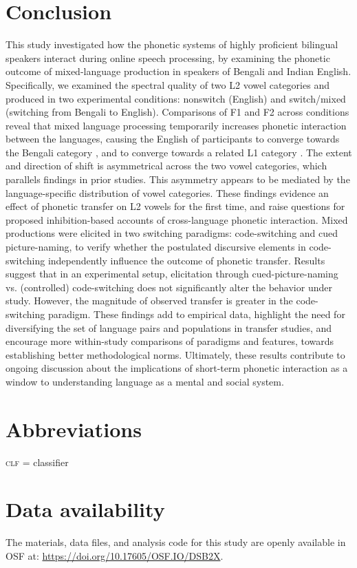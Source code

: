\documentclass[12 pt]{article}
\newcommand{\nt}[1]{\textipa{[#1]}} %
\begin{document}
\section{Conclusion}
This study investigated how the phonetic systems of highly proficient bilingual speakers interact during online speech processing, by examining the phonetic outcome of mixed-language production in speakers of Bengali and Indian English. Specifically, we examined the spectral quality of two L2 vowel categories \nt{2} and \nt{\ae} produced in two experimental conditions: nonswitch (English) and switch/mixed (switching from Bengali to English).
Comparisons of F1 and F2 across conditions reveal that mixed language processing temporarily increases phonetic interaction between the languages, causing the English \nt{\ae} of participants to converge towards the Bengali category \nt{\ae}, and \nt{2} to converge towards a related L1 category \nt{a:}. The extent and direction of shift is asymmetrical across the two vowel categories, which parallels findings in prior studies. This asymmetry appears to be mediated by the language-specific distribution of vowel categories. These findings evidence an effect of phonetic transfer on L2 vowels for the first time, and raise questions for proposed inhibition-based accounts of cross-language phonetic interaction. Mixed productions were elicited in two switching paradigms: code-switching and cued picture-naming, to verify whether the postulated discursive elements in code-switching independently influence the outcome of phonetic transfer. Results suggest that in an experimental setup, elicitation through cued-picture-naming vs. (controlled) code-switching does not significantly alter the behavior under study. However, the magnitude of observed transfer is greater in the code-switching paradigm. These findings add to empirical data, highlight the need for diversifying the set of language pairs and populations in transfer studies, and encourage more within-study comparisons of paradigms and features, towards establishing better methodological norms. Ultimately, these results contribute to ongoing discussion about the implications of short-term phonetic interaction as a window to understanding language as a mental and social system.

\section*{Abbreviations}
\textsc{clf} = classifier

\section*{Data availability} \label{data_availability}
The materials, data files, and analysis code for this study are openly available in OSF at:  \url{https://doi.org/10.17605/OSF.IO/DSB2X}.
\end{document}
